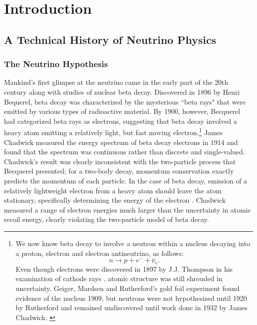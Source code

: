 \chapter{Introduction}
\label{intro_chapter}


\section{A Technical History of Neutrino Physics}
\subsection{The Neutrino Hypothesis}

Mankind's first glimpse at the neutrino came in the early part of the 20th century along with studies of nuclear beta decay.  Discovered in 1896 by Henri Bequerel, beta decay was characterized by the mysterious ``beta rays" that were emitted by various types of radioactive material.  \cite{becquerelBeta}  By 1900, however, Becquerel had categorized beta rays as electrons, suggesting that beta decay involved a heavy atom emitting a relatively light, but fast moving electron.\footnote{
We now know beta decay to involve a neutron within a nucleus decaying into a proton, electron and electron antineutrino, as follows: 
\begin{equation*}      n \rightarrow p + e^- + \bar{\nu}_e  . \end{equation*}
Even though electrons were discovered in 1897 by J.J. Thompson in his examination of cathode rays \cite{thompson}, atomic structure was still shrouded in uncertainty.  Geiger, Mardsen and Rutherford's gold foil experiment found evidence of the nucleus 1909, but neutrons were not hypothesized until 1920 by Rutherford \cite{rutherfordNeutron} and remained undiscovered until work done in 1932 by James Chadwick. \cite{chadwickNeutron}
 } \cite{becquerelElec}  
James Chadwick measured the energy spectrum of beta decay electrons in 1914 and found that the spectrum was continuous rather than discrete and single-valued.\cite {chadwickBeta}  Chadwick's result was clearly inconsistent with the two-particle process that Becquerel presented; for a two-body decay, momentum conservation exactly predicts the momentum of each particle.  In the case of beta decay, emission of a relatively lightweight electron from a heavy atom should leave the atom stationary, specifically determining the energy of the electron .  Chadwick measured a range of electron energies much larger than the uncertainty in atomic recoil energy, clearly violating the two-particle model of beta decay.  

